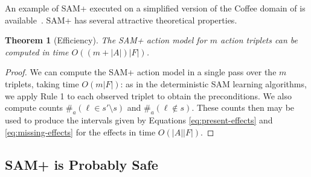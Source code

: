 \documentclass[letterpaper]{article} %
\newtheorem{theorem}{Theorem}
\newcommand{\tuple}[1]{\ensuremath{\left \langle #1 \right \rangle }}
\begin{document}

An example of SAM+ executed on a simplified version of the Coffee domain of \citet{dearden1997abstraction} is available~\cite{anExample2022juba}. 
SAM+ has several attractive theoretical properties. 
\begin{theorem}[Efficiency]
The SAM+ action model for $m$ action triplets can be computed in time $O((m+|A|)|F|)$.
\end{theorem}
\begin{proof}
We can compute the SAM+ action model in a single pass over the $m$ triplets, taking time $O(m|F|)$: as in the deterministic SAM learning algorithms, we apply Rule 1 to each observed triplet to obtain the preconditions. We also compute counts $\#_a(\ell\in s'\setminus s)$ and $\#_a(\ell\notin s)$. These counts then may be used to produce the intervals given by Equations \ref{eq:present-effects} and \ref{eq:missing-effects} for the effects in time $O(|A||F|)$.
\end{proof}


\subsection{SAM+ is Probably Safe}
\end{document}
